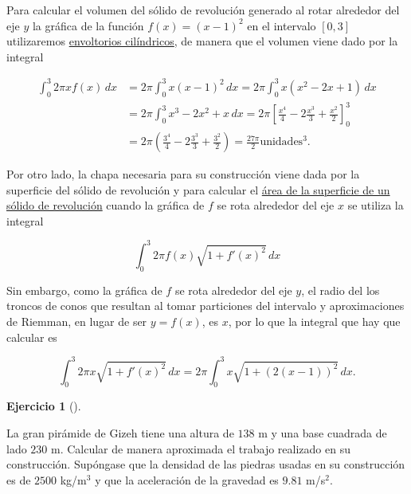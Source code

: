 \documentclass[
  spanish,
  a4paper,
]{scrreport}
\theoremstyle{definition}
\newtheorem{exercise}{Ejercicio}[chapter]
\theoremstyle{remark}
\begin{document}
\begin{tcolorbox}[enhanced jigsaw, arc=.35mm, bottomrule=.15mm, bottomtitle=1mm, breakable, colback=white, colbacktitle=quarto-callout-tip-color!10!white, colframe=quarto-callout-tip-color-frame, coltitle=black, left=2mm, leftrule=.75mm, opacityback=0, opacitybacktitle=0.6, rightrule=.15mm, title=\textcolor{quarto-callout-tip-color}{\faLightbulb}\hspace{0.5em}{Solución}, titlerule=0mm, toprule=.15mm, toptitle=1mm]

Para calcular el volumen del sólido de revolución generado al rotar
alrededor del eje \(y\) la gráfica de la función \(f(x)=(x-1)^2\) en el
intervalo \([0,3]\) utilizaremos
\href{https://aprendeconalf.es/analisis-manual/09-integrales.html\#c\%C3\%A1lculo-de-vol\%C3\%BAmenes-de-s\%C3\%B3lidos-de-revoluci\%C3\%B3n-con-envoltorios-cil\%C3\%ADndricos}{envoltorios
cilíndricos}, de manera que el volumen viene dado por la integral

\begin{align*}
\int_0^3 2\pi xf(x)\,dx
&= 2\pi \int_0^3 x(x-1)^2\,dx 
= 2\pi \int_0^3 x(x^2-2x+1)\,dx \\
&= 2\pi \int_0^3 x^3-2x^2+x\,dx
= 2\pi\left[\frac{x^4}{4}-2\frac{x^3}{3}+\frac{x^2}{2}\right]_0^3 \\
&= 2\pi \left(\frac{3^4}{4}-2\frac{3^3}{3}+\frac{3^2}{2}\right)
= \frac{27\pi}{2} \mbox{unidades$^3$}.
\end{align*}

Por otro lado, la chapa necesaria para su construcción viene dada por la
superficie del sólido de revolución y para calcular el
\href{https://aprendeconalf.es/analisis-manual/09-integrales.html\#c\%C3\%A1lculo-de-superficies-de-s\%C3\%B3lidos-de-revoluci\%C3\%B3n}{área
de la superficie de un sólido de revolución} cuando la gráfica de \(f\)
se rota alrededor del eje \(x\) se utiliza la integral

\[
\int_0^3 2\pi f(x)\sqrt{1+f'(x)^2}\,dx
\]

Sin embargo, como la gráfica de \(f\) se rota alrededor del eje \(y\),
el radio del los troncos de conos que resultan al tomar particiones del
intervalo y aproximaciones de Riemman, en lugar de ser \(y=f(x)\), es
\(x\), por lo que la integral que hay que calcular es

\[
\int_0^3 2\pi x\sqrt{1+f'(x)^2}\,dx = 2\pi\int_0^3 x\sqrt{1+(2(x-1))^2}\,dx.
\]

\end{tcolorbox}

\begin{exercise}[]\protect\hypertarget{exr-8}{}\label{exr-8}

La gran pirámide de Gizeh tiene una altura de \(138\) m y una base
cuadrada de lado \(230\) m. Calcular de manera aproximada el trabajo
realizado en su construcción. Supóngase que la densidad de las piedras
usadas en su construcción es de \(2500\) kg/m\(^3\) y que la aceleración
de la gravedad es \(9.81\) m/s\(^2\).

\end{exercise}
\end{document}
